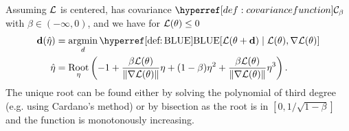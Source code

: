 
\begin{theorem}[Stationary]
	Assuming \(\mathcal{L}\) is centered, has covariance \(\C_\beta\) with
	\(\beta\in(-\infty, 0)\), and we have for \(\mathcal{L}(\theta)\le 0\)
	\begin{align*}
		\step(\hat{\lr})
		&= \argmin_{d}
		\BLUE[\Loss(\param + \step) \mid \Loss(\param), \grad\Loss(\param)]\\
		\hat{\lr}
		&= \Root_\lr\left(
			-1 + \frac{\beta\Loss(\param)}{\|\grad\Loss(\param)\|}\lr
			+(1-\beta)\lr^2 + \frac{\beta\Loss(\param)}{\|\grad\Loss(\param)\|}\lr^3
		\right).
	\end{align*}
	The unique root can be found either by solving the polynomial of third degree
	(e.g. using Cardano's method) or by bisection as the root is in \([0,
	1/\sqrt{1-\beta}]\) and the function is monotonously increasing.
\end{theorem}
